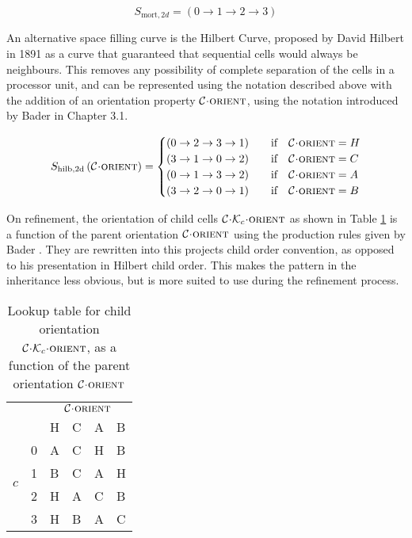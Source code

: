 \documentclass{IIBproject}
\newcommand{\acc}{{\mkern 0.5mu\cdot\mkern 0.5mu}}
\numberwithin{figure}{section}
\begin{document}
\begin{equation}
    \label{equ:sfc-mort2d}
    S_{\mathrm{mort},2d} = \left( 0 \to 1 \to 2 \to 3 \right)
\end{equation}

An alternative space filling curve is the Hilbert Curve, proposed by David Hilbert in 1891 as a curve that guaranteed that sequential cells would always be neighbours. This removes any possibility of complete separation of the cells in a processor unit, and can be represented using the notation described above with the addition of an orientation property $\mathcal{C}\acc\textproc{orient}$, using the notation introduced by Bader \cite{bader2013} in Chapter 3.1. 

\begin{equation}
    S_{\mathrm{hilb,2d}}\left(\mathcal{C}\acc\textproc{orient}\right) =
    \begin{cases}
        \left( 0 \to 2 \to 3 \to 1\right) & \qif \mathcal{C}\acc\textproc{orient}=H \\
        \left( 3 \to 1 \to 0 \to 2\right) & \qif \mathcal{C}\acc\textproc{orient}=C \\
        \left( 0 \to 1 \to 3 \to 2\right) & \qif \mathcal{C}\acc\textproc{orient}=A \\
        \left( 3 \to 2 \to 0 \to 1\right) & \qif \mathcal{C}\acc\textproc{orient}=B
    \end{cases}
\end{equation}

On refinement, the orientation of child cells $\mathcal{C}\acc\mathcal{K}_c\acc\textproc{orient}$ as shown in Table \ref{tab:hilb-Dc} is a function of the parent orientation $\mathcal{C}\acc\textproc{orient}$ using the production rules given by Bader \cite{bader2013}. They are rewritten into this projects child order convention, as opposed to his presentation in Hilbert child order. This makes the pattern in the inheritance less obvious, but is more suited to use during the refinement process.

\begin{table}[H]
    \centering
    \caption{Lookup table for child orientation $\mathcal{C}\acc\mathcal{K}_c\acc\textproc{orient}$, as a function of the parent orientation $\mathcal{C}\acc\textproc{orient}$}
    \label{tab:hilb-Dc}
    \begin{tabular}{ll|llll}
                         &   & \multicolumn{4}{c}{$\mathcal{C}\acc\textproc{orient}$} \\
                         &   & H    & C    & A    & B    \\ \hline
    \multirow{4}{*}{$c$} & 0 & A    & C    & H    & B    \\
                         & 1 & B    & C    & A    & H    \\
                         & 2 & H    & A    & C    & B    \\
                         & 3 & H    & B    & A    & C   
    \end{tabular}
\end{table}
\end{document}

